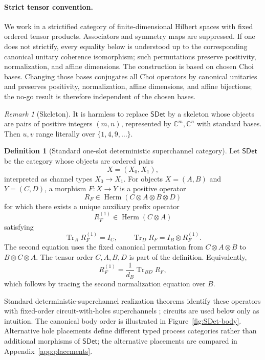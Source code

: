 \documentclass[11pt,a4paper]{article}
\theoremstyle{definition}
\newtheorem{definition}{Definition}[section]
\theoremstyle{plain}
\theoremstyle{remark}
\newtheorem{remark}[theorem]{Remark}
\DeclareMathOperator{\Tr}{Tr}
\DeclareMathOperator{\Herm}{Herm}
\newcommand{\SDet}{\mathsf{SDet}}
\begin{document}
\paragraph{Strict tensor convention.}
We work in a strictified category of finite-dimensional Hilbert spaces
with fixed ordered tensor products. Associators and symmetry maps are
suppressed. If one does not strictify, every equality below is understood
up to the corresponding canonical unitary coherence isomorphism; such
permutations preserve positivity, normalization, and affine dimensions.
The construction is based on chosen Choi bases. Changing those bases
conjugates all Choi operators by canonical unitaries and preserves
positivity, normalization, affine dimensions, and affine bijections; the
no-go result is therefore independent of the chosen bases.

\begin{remark}[Skeleton]
It is harmless to replace $\SDet$ by a skeleton whose objects are pairs of
positive integers $(m,n)$, represented by $\mathbb C^m,\mathbb C^n$ with
standard bases. Then $u,v$ range literally over $\{1,4,9,\ldots\}$.
\end{remark}

\begin{definition}[Standard one-slot deterministic superchannel category]
\label{def:SDet}
Let $\SDet$ be the category whose objects are ordered pairs
\[
X=(X_0,X_1),
\]
interpreted as channel types $X_0\to X_1$. For objects
$X=(A,B)$ and $Y=(C,D)$, a morphism $F:X\to Y$ is a positive operator
\[
R_F\in\Herm(C\otimes A\otimes B\otimes D)
\]
for which there exists a unique auxiliary prefix operator
\[
R_F^{(1)}\in\Herm(C\otimes A)
\]
satisfying
\[
\Tr_A R_F^{(1)}=I_C,
\qquad
\Tr_D R_F=I_B\otimes R_F^{(1)}.
\]
The second equation uses the fixed canonical permutation from
$C\otimes A\otimes B$ to $B\otimes C\otimes A$. The tensor order
$C,A,B,D$ is part of the definition. Equivalently,
\[
R_F^{(1)}=\frac{1}{d_B}\Tr_{BD}R_F,
\]
which follows by tracing the second normalization equation over $B$.
\end{definition}

Standard deterministic-superchannel
realization theorems identify these operators with fixed-order
circuit-with-holes superchannels \cite{chiribella2009,chiribella2013};
circuits are used below only as intuition. The canonical body order is
illustrated in Figure~\ref{fig:SDet-body}. Alternative hole placements
define different typed process categories rather than additional morphisms of
$\SDet$; the alternative placements are compared in
Appendix~\ref{app:placements}.
\end{document}
